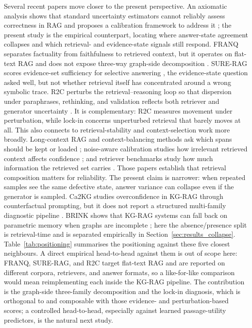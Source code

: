 Several recent papers move closer to the present perspective.
An axiomatic analysis shows that standard uncertainty estimators cannot reliably
assess correctness in RAG and proposes a calibration framework to address it
\citep{soudani2025axiomaticrag}; the present study is the empirical counterpart,
locating where answer-state agreement collapses and which retrieval- and
evidence-state signals still respond.
FRANQ separates factuality from faithfulness to retrieved context,
but it operates on flat-text RAG and does not expose three-way graph-side
decomposition \citep{fadeeva2025franq}.
SURE-RAG scores evidence-set sufficiency for selective answering
\citep{qiu2026surerag}, the evidence-state question asked well, but not
whether retrieval itself has concentrated around a wrong symbolic trace.
R2C perturbs the retrieval--reasoning loop so that dispersion under
paraphrases, rethinking, and validation reflects both retriever and generator
uncertainty \citep{soudani2025uqretrievalreasoning}.
It is complementary: R2C measures movement under perturbation, while lock-in
concerns unperturbed retrieval that barely moves at all.
This also connects to retrieval-stability and context-selection work more
broadly.
Long-context RAG and context-balancing methods ask which spans should be kept
or loaded \citep{li2024uncertaintyrag,voloshyn2026lrag}; noise-aware
calibration studies how irrelevant retrieved context affects confidence
\citep{liu2026nacc}; and retriever benchmarks study how much information the
retrieved set carries \citep{zheng2026revisitingrag}.
Those papers establish that retrieval composition matters for reliability.
The present claim is narrower: when repeated samples see the same defective
state, answer variance can collapse even if the generator is sampled.
Ca2KG studies overconfidence in KG-RAG through counterfactual prompting,
but it does not report a structured multi-family diagnostic pipeline
\citep{ren2026ca2kg}.
BRINK shows that KG-RAG systems can fall back on parametric memory when
graphs are incomplete \citep{zhou2025brink}; here the absence/presence split
is retrieval-time and is separated empirically in
Section~\ref{sec:results_collapse}.
Table~\ref{tab:positioning} summarises the positioning against these five
closest neighbours.
A direct empirical head-to-head against them is out of scope here: FRANQ,
SURE-RAG, and R2C target flat-text RAG and are reported on different corpora,
retrievers, and answer formats, so a like-for-like comparison would mean
reimplementing each inside the KG-RAG pipeline.
The contribution is the graph-side three-family decomposition and the lock-in
diagnosis, which is orthogonal to and composable with those evidence- and
perturbation-based scores; a controlled head-to-head, especially against
learned passage-utility predictors, is the natural next study.

